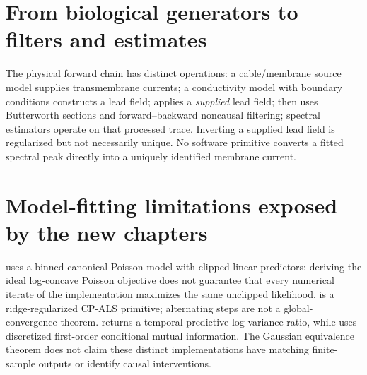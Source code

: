 \section{From biological generators to filters and estimates}
The physical forward chain has distinct operations:
a cable/membrane source model supplies transmembrane currents;
a conductivity model with boundary conditions constructs a lead field;
 applies a \emph{supplied} lead field;
 then uses Butterworth sections and forward--backward
noncausal filtering; spectral estimators operate on that processed trace.
Inverting a supplied lead field is regularized but not necessarily unique.
No software primitive converts a fitted spectral peak directly into a
uniquely identified membrane current.

\section{Model-fitting limitations exposed by the new chapters}
 uses a binned canonical Poisson model with
clipped linear predictors: deriving the ideal log-concave Poisson
objective does not guarantee that every numerical iterate of the
implementation maximizes the same unclipped likelihood.
 is a ridge-regularized CP-ALS primitive; alternating
steps are not a global-convergence theorem. 
returns a temporal predictive log-variance ratio, while
 uses discretized first-order
conditional mutual information. The Gaussian equivalence theorem
does not claim these distinct implementations have matching finite-sample
outputs or identify causal interventions.
